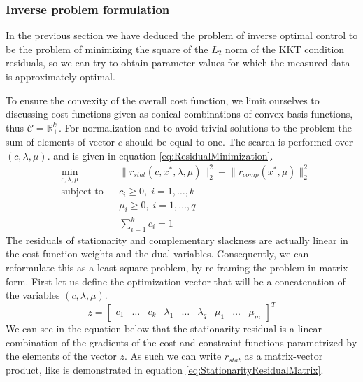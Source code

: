 \documentclass[12pt, a4paper]{article}
\newcommand{\norm}[1]{\lVert#1\rVert_2}         %
\begin{document}
\subsubsection{Inverse problem formulation}
In the previous section we have deduced the problem of inverse optimal control to be the problem of minimizing the square of the \( L_2\) norm of the KKT condition residuals, so we can try to obtain parameter values for which the measured data is approximately optimal.\par
To ensure the convexity of the overall cost function, we limit ourselves to discussing cost functions given as conical combinations of convex basis functions, thus \( \mathcal{C} = \mathbb{R}_+^k\). For normalization and to avoid trivial solutions to the problem the sum of elements of vector \( c\) should be equal to one. The search is performed over \( (c, \lambda, \mu) \). and is given in equation \eqref{eq:ResidualMinimization}.
\begin{equation} \label{eq:ResidualMinimization}
    \begin{aligned}
    &\min_{c, \lambda, \mu} & & \norm{r_{stat}(c, x^*, \lambda, \mu)}^2 + \norm{{r_{comp}}(x^*, \mu)}^2 \\
    &\text{subject to} & & c_i \geq 0, \; i = 1,\dots,k\\
    &                  & & \mu_i \geq 0, \; i = 1,\ldots,q \\
    &                  & & \sum_{i=1}^k c_i = 1
    \end{aligned}
\end{equation}
The residuals of stationarity and complementary slackness are actually linear in the cost function weights and the dual variables. Consequently, we can reformulate this as a least square problem, by re-framing the problem in matrix form. First let us define the optimization vector that will be a concatenation of the variables \( (c, \lambda, \mu) \).
\begin{equation} \label{eq:OptimizationVectorIOC}
z = 
\begin{bmatrix}
c_1  & \ldots & c_k & \lambda_1  & \ldots & \lambda_q & \mu_1 & \ldots & \mu_m
\end{bmatrix}^T
\end{equation}
We can see in the equation below that the stationarity residual is a linear combination of the gradients of the cost and constraint functions parametrized by the elements of the vector \( z\). As such we can write \( r_{stat} \) as a matrix-vector product, like is demonstrated in equation \eqref{eq:StationarityResidualMatrix}.
\end{document}

